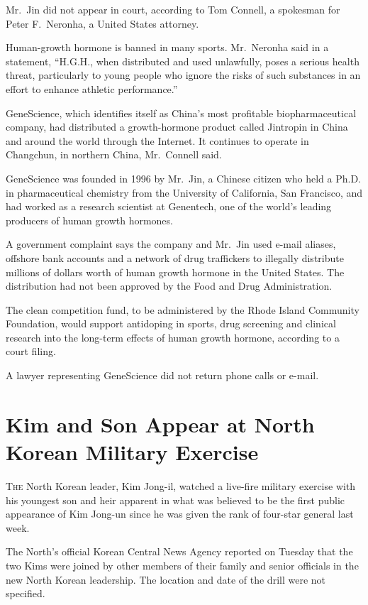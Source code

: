 ﻿\documentclass[12pt]{article}
\begin{document}
Mr.~Jin did not appear in court, according to Tom Connell, a spokesman for Peter F.~Neronha, a
United States attorney.

Human-growth hormone is banned in many sports. Mr.~Neronha said in a statement, ``H.G.H., when
distributed and used unlawfully, poses a serious health threat, particularly to young people who
ignore the risks of such substances in an effort to enhance athletic performance.''

GeneScience, which identifies itself as China's most profitable biopharmaceutical company, had
distributed a growth-hormone product called Jintropin in China and around the world through the
Internet. It continues to operate in Changchun, in northern China, Mr.~Connell said.

GeneScience was founded in 1996 by Mr.~Jin, a Chinese citizen who held a Ph.D. in pharmaceutical
chemistry from the University of California, San Francisco, and had worked as a research scientist
at Genentech, one of the world's leading producers of human growth hormones.

A government complaint says the company and Mr.~Jin used e-mail aliases, offshore bank accounts and
a network of drug traffickers to illegally distribute millions of dollars worth of human growth
hormone in the United States. The distribution had not been approved by the Food and Drug
Administration.

The clean competition fund, to be administered by the Rhode Island Community Foundation, would
support antidoping in sports, drug screening and clinical research into the long-term effects of
human growth hormone, according to a court filing.

A lawyer representing GeneScience did not return phone calls or e-mail.

\section{Kim and Son Appear at North Korean Military Exercise}

\lettrine{T}{he} North Korean leader, Kim Jong-il, watched a live-fire
military exercise with his youngest son and heir apparent in what was believed to be the first
public appearance of Kim Jong-un since he was given the rank of four-star general last week.

The North's official Korean Central News Agency reported on Tuesday that the two Kims were joined by
other members of their family and senior officials in the new North Korean leadership. The location
and date of the drill were not specified.
\end{document}
